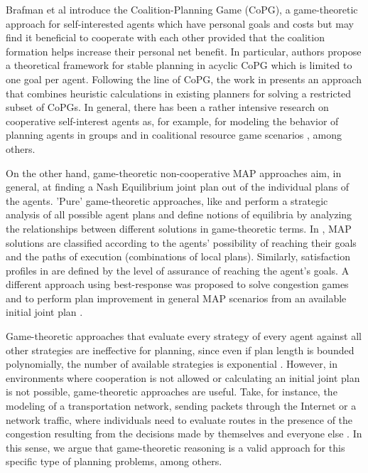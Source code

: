 \documentclass[letterpaper]{article}
\begin{document}
Brafman et al \cite{BrafmanDET09} introduce the Coalition-Planning Game (CoPG), a game-theoretic approach for self-interested agents which have personal goals and costs but may find it beneficial to cooperate with each other provided that the coalition formation helps increase their personal net benefit. In particular, authors propose a theoretical framework for stable planning in acyclic CoPG which is limited to one goal per agent. Following the line of CoPG, the work in \cite{CrosbyR11} presents an approach that combines heuristic calculations in existing planners for solving a restricted subset of CoPGs. In general, there has been a rather intensive research on cooperative self-interest agents as, for example, for modeling the behavior of planning agents in groups \cite{Hadad13} and in coalitional resource game scenarios \cite{Dunne2010}, among others.

On the other hand, game-theoretic non-cooperative MAP approaches aim, in general, at finding a Nash Equilibrium joint plan out of the individual plans of the agents. 'Pure' game-theoretic approaches, like \cite{BowlingJV03} and \cite{LarbiKM07} perform a strategic analysis of all possible agent plans and define notions of equilibria by analyzing the relationships between different solutions in game-theoretic terms. In \cite{BowlingJV03}, MAP solutions are classified according to the agents' possibility of reaching their goals and the paths of execution (combinations of local plans). Similarly, satisfaction profiles in \cite{LarbiKM07} are defined by the level of assurance of reaching the agent's goals. A different approach using best-response was proposed to solve congestion games and to perform plan improvement in general MAP scenarios from an available initial joint plan \cite{JonssonR11}.

Game-theoretic approaches that evaluate every strategy of every agent against all other strategies are ineffective for planning,
since even if plan length is bounded polynomially, the number of available strategies is exponential \cite{Nissim13}. However, in environments where cooperation is not allowed or calculating an initial joint plan is not possible, game-theoretic approaches are useful. Take, for instance, the modeling of a transportation network, sending packets through the Internet or a network traffic, where individuals need to evaluate routes in the presence of the congestion resulting from the decisions made by themselves and everyone else \cite{EasleyK10}. In this sense, we argue that game-theoretic reasoning is a valid approach for this specific type of planning problems, among others.
\end{document}
